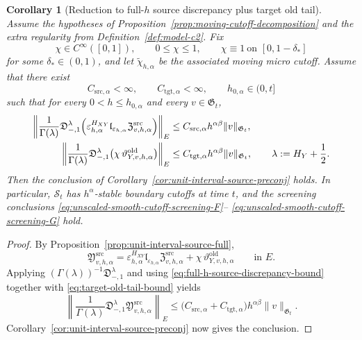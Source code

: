 \documentclass[11pt,a4paper]{amsart}
\theoremstyle{plain}
\newtheorem{corollary}[theorem]{Corollary}
\theoremstyle{definition}
\theoremstyle{remark}
\begin{document}
\begin{corollary}[Reduction to full-\(h\) source discrepancy plus target old tail]
\label{cor:unit-interval-source-full}
Assume the hypotheses of Proposition~\ref{prop:moving-cutoff-decomposition} and the extra regularity
from Definition~\ref{def:model-c2}. Fix
\[
\chi\in C^\infty([0,1]),
\qquad
0\le \chi\le1,
\qquad
\chi\equiv1\ \text{on }[0,1-\delta_*]
\]
for some \(\delta_*\in(0,1)\), and let \(\widetilde\chi_{h,\alpha}\) be the associated moving micro
cutoff. Assume that there exist
\[
C_{\mathrm{src},\alpha}<\infty,
\qquad
C_{\mathrm{tgt},\alpha}<\infty,
\qquad
h_{0,\alpha}\in(0,t]
\]
such that for every \(0<h\le h_{0,\alpha}\) and every \(v\in\mathfrak G_t\),
\begin{align}
\left\|
\frac{1}{\Gamma(\lambda)}
\mathfrak D_{-,1}^{\lambda}
\Bigl(
\varepsilon_{h,\alpha}^{H_{XY}}
\mathfrak l_{\varepsilon_{h,\alpha}}
\mathfrak Z_{v,h,\alpha}^{\mathrm{src}}
\Bigr)
\right\|_{E}
&\le
C_{\mathrm{src},\alpha}h^{\alpha\beta}\|v\|_{\mathfrak G_t},
\label{eq:full-h-source-discrepancy-bound}\\
\left\|
\frac{1}{\Gamma(\lambda)}
\mathfrak D_{-,1}^{\lambda}
\bigl(
\chi\,\vartheta_{Y,v,h,\alpha}^{\mathrm{old}}
\bigr)
\right\|_{E}
&\le
C_{\mathrm{tgt},\alpha}h^{\alpha\beta}\|v\|_{\mathfrak G_t},
\qquad
\lambda:=H_Y+\frac12.
\label{eq:target-old-tail-bound}
\end{align}
Then the conclusion of Corollary~\ref{cor:unit-interval-source-preconj} holds. In particular,
\(\mathcal S_t\) has \(h^\alpha\)-stable boundary cutoffs at time \(t\), and the screening
conclusions \eqref{eq:unscaled-smooth-cutoff-screening-F}--
\eqref{eq:unscaled-smooth-cutoff-screening-G} hold.
\end{corollary}

\begin{proof}
By Proposition~\ref{prop:unit-interval-source-full},
\[
\mathfrak Y_{v,h,\alpha}^{\mathrm{src}}
=
\varepsilon_{h,\alpha}^{H_{XY}}
\mathfrak l_{\varepsilon_{h,\alpha}}
\mathfrak Z_{v,h,\alpha}^{\mathrm{src}}
+
\chi\,\vartheta_{Y,v,h,\alpha}^{\mathrm{old}}
\qquad\text{in }E.
\]
Applying \((\Gamma(\lambda))^{-1}\mathfrak D_{-,1}^{\lambda}\) and using
\eqref{eq:full-h-source-discrepancy-bound} together with \eqref{eq:target-old-tail-bound} yields
\[
\left\|
\frac{1}{\Gamma(\lambda)}
\mathfrak D_{-,1}^{\lambda}
\mathfrak Y_{v,h,\alpha}^{\mathrm{src}}
\right\|_{E}
\le
\bigl(
C_{\mathrm{src},\alpha}+C_{\mathrm{tgt},\alpha}
\bigr)
h^{\alpha\beta}\|v\|_{\mathfrak G_t}.
\]
Corollary~\ref{cor:unit-interval-source-preconj} now gives the conclusion.
\end{proof}
\end{document}
